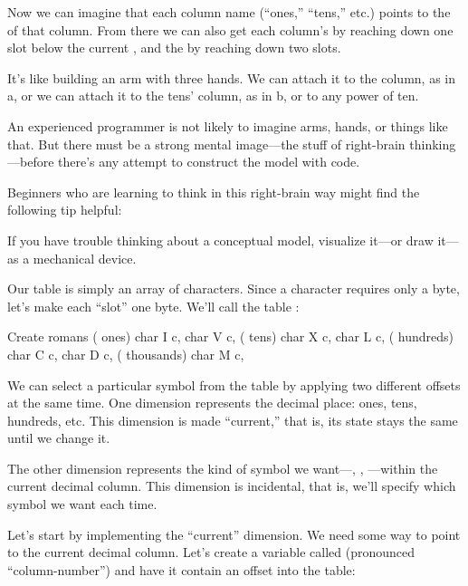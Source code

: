 \noindent Now we can imagine that each column name (``ones,'' ``tens,''
etc.) points to the  of that column. From there we can also
get each column's  by reaching down one slot below the
current , and the  by reaching down two slots.

It's like building an arm with three hands. We can attach it to the
 column, as in a, or we can attach it to the tens'
column, as in b, or to any power of ten.



An experienced \Forth{} programmer is not likely to imagine arms,
hands, or things like that. But there must be a strong mental image---the
stuff of right-brain thinking---before there's any attempt to construct the
model with code.

Beginners who are learning to think in this right-brain way might
find the following tip helpful:

\begin{tip}
If you have trouble thinking about a conceptual model,
visualize it---or draw it---as a mechanical device.
\end{tip}
Our table is simply an array of characters. Since a character requires
only a byte, let's make each ``slot'' one byte. We'll call the table
:

\begin{Code}
Create romans    ( ones)  char I  c,   char V  c,
                 ( tens)  char X  c,   char L  c,
             ( hundreds)  char C  c,   char D  c,
            ( thousands)  char M  c,
\end{Code}
We can select a particular symbol from the table by applying two
different offsets at the same time. One dimension represents the decimal
place: ones, tens, hundreds, etc. This dimension is made ``current,'' that
is, its state stays the same until we change it.

The other dimension represents the kind of symbol we want---,
, ---within the current decimal column. This
dimension is incidental, that is, we'll specify which symbol we want each
time.

Let's start by implementing the ``current'' dimension. We need
some way to point to the current decimal column. Let's create a variable
called  (pronounced ``column-number'') and have it contain an
offset into the table:

